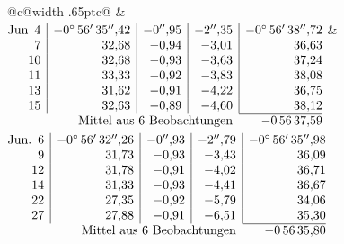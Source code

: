 \noindent\begin{tabular}{@{}c@{\hspace{.4em}\vrule width .65pt\hspace{.4em}}c@{}}
 &
 \\[.18ex]
\(\begin{array}[t]{@{}r|r|r|r|r@{}}
\text{Jun}\enspace 4 & -0^\circ\,56'\,35''{,}42 & -0''{,}95 & -2''{,}35 & -0^\circ\,56'\,38''{,}72\\
7 & 32{,}68 & -0{,}94 & -3{,}01 & 36{,}63\\
10 & 32{,}68 & -0{,}93 & -3{,}63 & 37{,}24\\
11 & 33{,}33 & -0{,}92 & -3{,}83 & 38{,}08\\
13 & 31{,}62 & -0{,}91 & -4{,}22 & 36{,}75\\
15 & 32{,}63 & -0{,}89 & -4{,}60 & 38{,}12\\
\cline{5-5}
\multicolumn{4}{r}{\text{Mittel aus 6 Beobachtungen}} & -0\,56\,37{,}59
\end{array}\)
&
\(\begin{array}[t]{@{}r|r|r|r|r@{}}
\text{Jun.}\enspace 6 & -0^\circ\,56'\,32''{,}26 & -0''{,}93 & -2''{,}79 & -0^\circ\,56'\,35''{,}98\\
9 & 31{,}73 & -0{,}93 & -3{,}43 & 36{,}09\\
12 & 31{,}78 & -0{,}91 & -4{,}02 & 36{,}71\\
14 & 31{,}33 & -0{,}93 & -4{,}41 & 36{,}67\\
22 & 27{,}35 & -0{,}92 & -5{,}79 & 34{,}06\\
27 & 27{,}88 & -0{,}91 & -6{,}51 & 35{,}30\\
\cline{5-5}
\multicolumn{4}{r}{\text{Mittel aus 6 Beobachtungen}} & -0\,56\,35{,}80
\end{array}\)
\end{tabular}\par\medskip
{}
